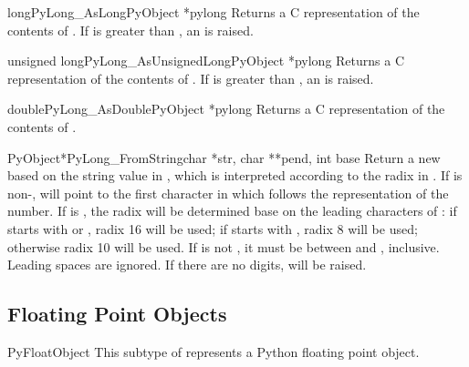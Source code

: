 \documentclass{manual}
\begin{document}
\begin{cfuncdesc}{long}{PyLong_AsLong}{PyObject *pylong}
Returns a C  representation of the contents of
.  If  is greater than
, an  is
raised.
\end{cfuncdesc}

\begin{cfuncdesc}{unsigned long}{PyLong_AsUnsignedLong}{PyObject *pylong}
Returns a C  representation of the contents of 
.  If  is greater than
, an 
is raised.
\end{cfuncdesc}

\begin{cfuncdesc}{double}{PyLong_AsDouble}{PyObject *pylong}
Returns a C  representation of the contents of .
\end{cfuncdesc}

\begin{cfuncdesc}{PyObject*}{PyLong_FromString}{char *str, char **pend,
                                                int base}
Return a new  based on the string value in
, which is interpreted according to the radix in .
If  is non-\NULL,  will point to the first 
character in  which follows the representation of the
number.  If  is , the radix will be determined base
on the leading characters of : if  starts with
 or , radix 16 will be used; if  starts 
with , radix 8 will be used; otherwise radix 10 will be
used.  If  is not , it must be between  and
, inclusive.  Leading spaces are ignored.  If there are no
digits,  will be raised.
\end{cfuncdesc}


\subsection{Floating Point Objects \label{floatObjects}}

\begin{ctypedesc}{PyFloatObject}
This subtype of  represents a Python floating point
object.
\end{ctypedesc}
\end{document}
